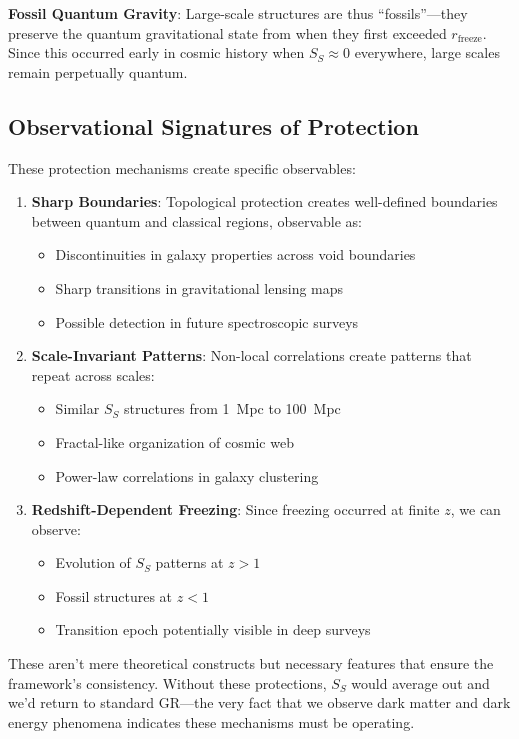 \documentclass[12pt]{article}
\begin{document}
\textbf{Fossil Quantum Gravity}: Large-scale structures are thus ``fossils''---they preserve the quantum gravitational state from when they first exceeded $r_\mathrm{freeze}$. Since this occurred early in cosmic history when $S_S \approx 0$ everywhere, large scales remain perpetually quantum.

\subsection{Observational Signatures of Protection}

These protection mechanisms create specific observables:
\begin{enumerate}
    \item \textbf{Sharp Boundaries}: Topological protection creates well-defined boundaries between quantum and classical regions, observable as:
        \begin{itemize}
            \item Discontinuities in galaxy properties across void boundaries
            \item Sharp transitions in gravitational lensing maps
            \item Possible detection in future spectroscopic surveys
        \end{itemize}
    \item \textbf{Scale-Invariant Patterns}: Non-local correlations create patterns that repeat across scales:
        \begin{itemize}
            \item Similar $S_S$ structures from 1~Mpc to 100~Mpc
            \item Fractal-like organization of cosmic web
            \item Power-law correlations in galaxy clustering
        \end{itemize}
    \item \textbf{Redshift-Dependent Freezing}: Since freezing occurred at finite $z$, we can observe:
        \begin{itemize}
            \item Evolution of $S_S$ patterns at $z > 1$
            \item Fossil structures at $z < 1$
            \item Transition epoch potentially visible in deep surveys
        \end{itemize}
\end{enumerate}
These aren't mere theoretical constructs but necessary features that ensure the framework's consistency. Without these protections, $S_S$ would average out and we'd return to standard GR---the very fact that we observe dark matter and dark energy phenomena indicates these mechanisms must be operating.
\end{document}
